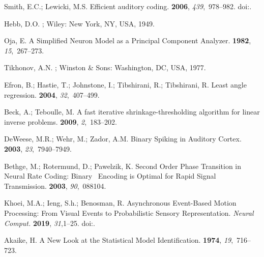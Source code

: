 \documentclass[vision,article,accept,oneauthor,pdftex]{Definitions/mdpi}
\begin{document}
\begin{thebibliography}{999}
Smith, E.C.; Lewicki, M.S.
\newblock Efficient auditory coding.
 {\bf 2006}, {\em 439},~978--982.
\newblock
  doi:{\href{https://doi.org/10.1038/nature04485}{}}.

Hebb, D.O.
;
  Wiley: New York, NY, USA, 1949.

Oja, E.
\newblock A {S}implified {N}euron {M}odel as a {P}rincipal {C}omponent
  {A}nalyzer.
 {\bf 1982}, {\em
  15},~267--273.

Tikhonov, A.N.
; Winston \& Sons: Washington, DC, USA,    1977.

Efron, B.; Hastie, T.; Johnstone, I.; Tibshirani, R.; Tibshirani, R.
\newblock Least angle regression.
 {\bf 2004}, {\em 32},~407--499.

Beck, A.; Teboulle, M.
\newblock A fast iterative shrinkage-thresholding algorithm for linear inverse
  problems.
 {\bf 2009}, {\em 2},~183--202.

DeWeese, M.R.; Wehr, M.; Zador, A.M.
\newblock Binary Spiking in Auditory Cortex.
 {\bf 2003}, {\em 23},~7940--7949.

Bethge, M.; Rotermund, D.; Pawelzik, K.
\newblock Second Order Phase Transition in Neural Rate Coding: Binary~ Encoding
  is Optimal for Rapid Signal Transmission.
 {\bf 2003}, {\em 90},~088104.

Khoei, M.A.; Ieng, S.h.; Benosman, R.
\newblock Asynchronous {{Event}}-{{Based Motion Processing}}: {{From Visual
  Events}} to {{Probabilistic Sensory Representation}}.
\newblock  \emph{Neural Comput.} \textbf{2019}, \emph{31},1--25. 
  doi:{\href{https://doi.org/10/gfzhp2}{}}.

Akaike, H.
\newblock A New Look at the Statistical Model Identification.
 {\bf 1974}, {\em
  19},~716--723.


\end{thebibliography}
\end{document}
